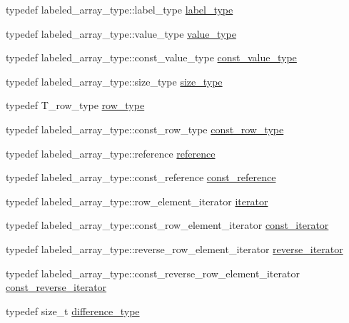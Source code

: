 \begin{DoxyCompactItemize}
\item 
typedef labeled\+\_\+array\+\_\+type\+::label\+\_\+type \hyperlink{classIceBRG_1_1labeled__array__row__reference_a0b7e29867009277fee9102863be2d63a}{label\+\_\+type}
\item 
typedef labeled\+\_\+array\+\_\+type\+::value\+\_\+type \hyperlink{classIceBRG_1_1labeled__array__row__reference_ae6cfe4bdcb3bc59c3d7613193633f063}{value\+\_\+type}
\item 
typedef labeled\+\_\+array\+\_\+type\+::const\+\_\+value\+\_\+type \hyperlink{classIceBRG_1_1labeled__array__row__reference_a3eaf76b7cd84107e68c41cd4fc056c39}{const\+\_\+value\+\_\+type}
\item 
typedef labeled\+\_\+array\+\_\+type\+::size\+\_\+type \hyperlink{classIceBRG_1_1labeled__array__row__reference_a80c5d11ebfa639fa27894ce288633df0}{size\+\_\+type}
\item 
typedef T\+\_\+row\+\_\+type \hyperlink{classIceBRG_1_1labeled__array__row__reference_a5b537072b2f12f7a4ea9484e2e26986d}{row\+\_\+type}
\item 
typedef labeled\+\_\+array\+\_\+type\+::const\+\_\+row\+\_\+type \hyperlink{classIceBRG_1_1labeled__array__row__reference_a80b2a3ea3231a22bf8c493841ad8cf3a}{const\+\_\+row\+\_\+type}
\item 
typedef labeled\+\_\+array\+\_\+type\+::reference \hyperlink{classIceBRG_1_1labeled__array__row__reference_a24c2694c9ca46757f21f7024a229c925}{reference}
\item 
typedef labeled\+\_\+array\+\_\+type\+::const\+\_\+reference \hyperlink{classIceBRG_1_1labeled__array__row__reference_a7343692e3cbf28a9edfff61f6812f355}{const\+\_\+reference}
\item 
typedef labeled\+\_\+array\+\_\+type\+::row\+\_\+element\+\_\+iterator \hyperlink{classIceBRG_1_1labeled__array__row__reference_a6019a8a167f6816b145f39478b2fb691}{iterator}
\item 
typedef labeled\+\_\+array\+\_\+type\+::const\+\_\+row\+\_\+element\+\_\+iterator \hyperlink{classIceBRG_1_1labeled__array__row__reference_a32426fe25a4b7f8659eb5fe2b58ecba2}{const\+\_\+iterator}
\item 
typedef labeled\+\_\+array\+\_\+type\+::reverse\+\_\+row\+\_\+element\+\_\+iterator \hyperlink{classIceBRG_1_1labeled__array__row__reference_a69e88ba1f1071a47fa00e4ec45f8147d}{reverse\+\_\+iterator}
\item 
typedef labeled\+\_\+array\+\_\+type\+::const\+\_\+reverse\+\_\+row\+\_\+element\+\_\+iterator \hyperlink{classIceBRG_1_1labeled__array__row__reference_a4bb091c3a6d8be3b433acbc02745fa0a}{const\+\_\+reverse\+\_\+iterator}
\item 
typedef size\+\_\+t \hyperlink{classIceBRG_1_1labeled__array__row__reference_a3c4333001dfc05e470766b9c2786f630}{difference\+\_\+type}
\end{DoxyCompactItemize}
